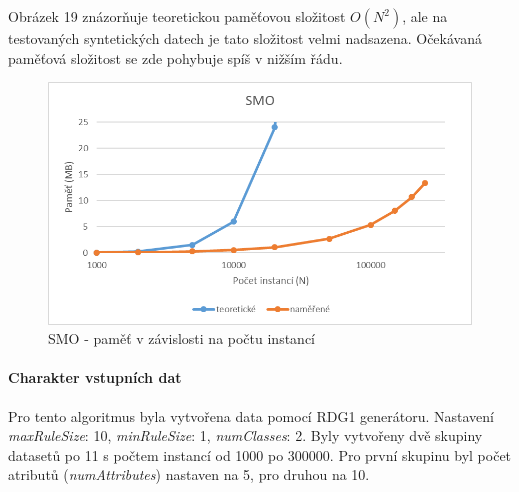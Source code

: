 \documentclass[12pt]{article}
\begin{document}
Obrázek 19 znázorňuje teoretickou paměťovou složitost $O(N^2)$, ale na testovaných syntetických datech je tato složitost velmi nadsazena. Očekávaná paměťová složitost se zde pohybuje spíš v nižším řádu.
\begin{figure}[hbp]
  \centering
  \includegraphics[scale=1]{img/smop.png}
  \caption{SMO - paměť v závislosti na počtu instancí}
\end{figure}

\newpage
{}
\paragraph{Charakter vstupních dat}
Pro tento algoritmus byla vytvořena data pomocí RDG1 generátoru. Nastavení \textit{maxRuleSize}: 10, \textit{minRuleSize}: 1, \textit{numClasses}: 2. Byly vytvořeny dvě skupiny datasetů po 11 s počtem instancí od 1000 po 300000. Pro první skupinu byl počet atributů (\textit{numAttributes}) nastaven na 5, pro druhou na 10.
\end{document}
